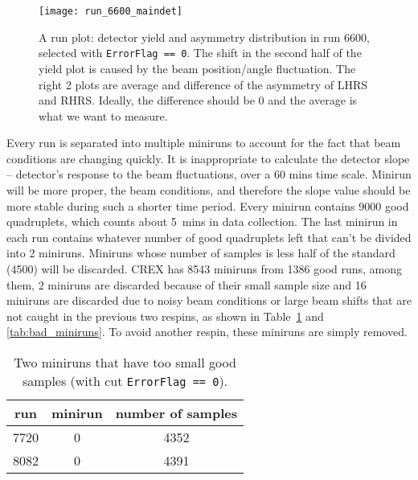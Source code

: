 \begin{figure}[!h]
    \centering
    \texttt{[image: run\_6600\_maindet]}
    \caption[A run plot: detector yield and asymmetry distribution in run 6600]
    {A run plot: detector yield and asymmetry distribution in run 6600, 
    selected with \texttt{ErrorFlag == 0}. The shift in the second half of the 
    yield plot is caused by the beam position/angle fluctuation. 
    The right 2 plots are average and difference of the asymmetry of LHRS and RHRS. 
    Ideally, the difference should be 0 and the average is what we want to measure.
    }
\end{figure}

Every run is separated into multiple miniruns to account for the fact that beam
conditions are changing quickly. It is inappropriate to calculate the detector
slope -- detector's response to the beam fluctuations, over a 60 mins time scale. 
Minirun will be more proper, the beam conditions, and therefore
the slope value should be more stable during such a shorter time period.  
Every minirun contains 9000 good quadruplets, which counts about 5~mins
in data collection. The last minirun in each run contains 
whatever number of good quadruplets left that can't be divided into 2 miniruns. 
Miniruns whose number of samples is less half of the standard (4500) will be discarded.
CREX has 8543 miniruns from 1386 good runs, among them, 2 miniruns are discarded
because of their small sample size and 16 miniruns are discarded due to noisy beam conditions 
or large beam shifts that are not caught in the previous two respins, as shown
in Table~\ref{tab:short_miniruns} and \ref{tab:bad_miniruns}.
To avoid another respin, these miniruns are simply removed. %
\begin{table}[!h]
    \centering
    \begin{tabular}{c c c}
	\hline
	run & minirun	& number of samples \\
	\hline
	7720	& 0 & 4352  \\
	8082	& 0 & 4391  \\
	\hline
    \end{tabular}
    \caption{Two miniruns that have too small good samples (with cut \texttt{ErrorFlag == 0}).}
    \label{tab:short_miniruns}
\end{table}
